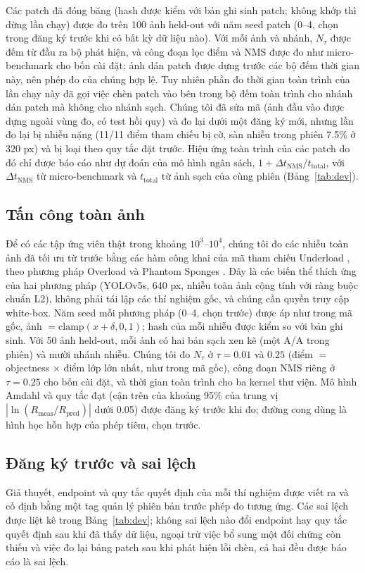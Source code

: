 \documentclass[a4paper,fleqn]{cas-dc}
\newcommand{\Ntau}{N_{\tau}}
\begin{document}
Các patch đã đóng băng (hash được kiểm với bản ghi sinh patch; không khớp thì dừng lần chạy) được đo trên 100 ảnh held-out với năm seed patch (0--4, chọn trong đăng ký trước khi có bất kỳ dữ liệu nào). Với mỗi ảnh và nhánh, $\Ntau$ được đếm từ đầu ra bộ phát hiện, và công đoạn lọc điểm và NMS được đo như micro-benchmark cho bốn cài đặt; ảnh dán patch được dựng trước các bộ đếm thời gian này, nên phép đo của chúng hợp lệ. Tuy nhiên phần đo thời gian toàn trình của lần chạy này đã gọi việc chèn patch vào bên trong bộ đếm toàn trình cho nhánh dán patch mà không cho nhánh sạch. Chúng tôi đã sửa mã (ảnh đầu vào được dựng ngoài vùng đo, có test hồi quy) và đo lại dưới một đăng ký mới, nhưng lần đo lại bị nhiễu nặng (11/11 điểm tham chiếu bị cờ, sàn nhiễu trong phiên 7.5\% ở 320 px) và bị loại theo quy tắc đặt trước. Hiệu ứng toàn trình của các patch do đó chỉ được báo cáo như dự đoán của mô hình ngân sách, $1+\Delta t_{\mathrm{NMS}}/t_{\mathrm{total}}$, với $\Delta t_{\mathrm{NMS}}$ từ micro-benchmark và $t_{\mathrm{total}}$ từ ảnh sạch của cùng phiên (Bảng~\ref{tab:dev}).

\subsection{Tấn công toàn ảnh}
Để có các tập ứng viên thật trong khoảng $10^3$--$10^4$, chúng tôi đo các nhiễu toàn ảnh đã tối ưu từ trước bằng các hàm công khai của mã tham chiếu Underload \cite{underload2025}, theo phương pháp Overload \cite{overload2024} và Phantom Sponges \cite{phantom2023}. Đây là các biến thể thích ứng của hai phương pháp (YOLOv5s, 640 px, nhiễu toàn ảnh cộng tính với ràng buộc chuẩn L2), không phải tái lập các thí nghiệm gốc, và chúng cần quyền truy cập white-box. Năm seed mỗi phương pháp (0--4, chọn trước) được áp như trong mã gốc, ảnh $=\mathrm{clamp}(x+\delta,0,1)$; hash của mỗi nhiễu được kiểm so với bản ghi sinh. Với 50 ảnh held-out, mỗi ảnh có hai bản sạch xen kẽ (một A/A trong phiên) và mười nhánh nhiễu. Chúng tôi đo $\Ntau$ ở $\tau=0.01$ và $0.25$ (điểm $=$ objectness $\times$ điểm lớp lớn nhất, như trong mã gốc), công đoạn NMS riêng ở $\tau=0.25$ cho bốn cài đặt, và thời gian toàn trình cho ba kernel thư viện. Mô hình Amdahl và quy tắc đạt (cận trên của khoảng 95\% của trung vị $|\ln(R_{\mathrm{meas}}/R_{\mathrm{pred}})|$ dưới 0.05) được đăng ký trước khi đo; đường cong dùng là hình học hỗn hợp của phép tiêm, chọn trước.

\subsection{Đăng ký trước và sai lệch}
Giả thuyết, endpoint và quy tắc quyết định của mỗi thí nghiệm được viết ra và cố định bằng một tag quản lý phiên bản trước phép đo tương ứng. Các sai lệch được liệt kê trong Bảng~\ref{tab:dev}; không sai lệch nào đổi endpoint hay quy tắc quyết định sau khi đã thấy dữ liệu, ngoại trừ việc bổ sung một đối chứng còn thiếu và việc đo lại bảng patch sau khi phát hiện lỗi chèn, cả hai đều được báo cáo là sai lệch.
\end{document}
